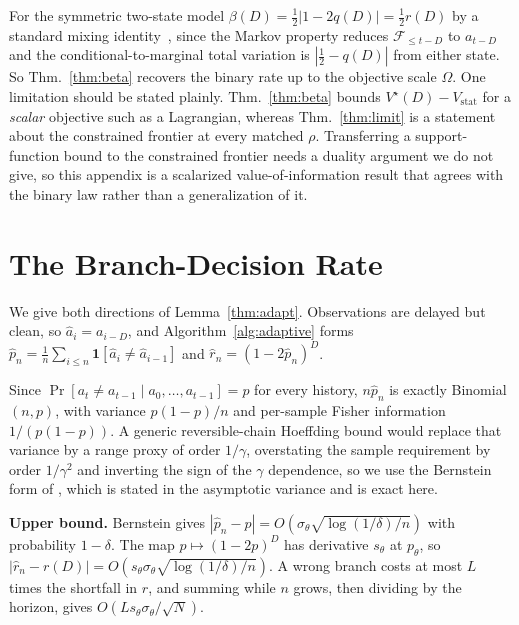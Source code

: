 For the symmetric two-state model $\beta(D)=\tfrac12|1-2q(D)|=\tfrac12 r(D)$ by a
standard mixing identity~\cite{bradley2005,lpw}, since the Markov property reduces
$\mathcal F_{\le t-D}$ to $a_{t-D}$ and the conditional-to-marginal total variation
is $|\tfrac12-q(D)|$ from either state. So Thm.~\ref{thm:beta} recovers the binary rate up to the objective scale
$\Omega$. One limitation should be stated plainly. Thm.~\ref{thm:beta} bounds
$V^\star(D)-V_{\mathrm{stat}}$ for a \emph{scalar} objective such as a Lagrangian,
whereas Thm.~\ref{thm:limit} is a statement about the constrained frontier at every
matched $\rho$. Transferring a support-function bound to the constrained frontier
needs a duality argument we do not give, so this appendix is a scalarized
value-of-information result that agrees with the binary law rather than a
generalization of it.

\section{The Branch-Decision Rate}
\label{app:regret}
We give both directions of Lemma~\ref{thm:adapt}. Observations are delayed but
clean, so $\hat a_i=a_{i-D}$, and Algorithm~\ref{alg:adaptive} forms
$\hat p_n=\tfrac1n\sum_{i\le n}\mathbf 1[\hat a_i\neq\hat a_{i-1}]$ and
$\hat r_n=(1-2\hat p_n)^{D}$.

Since $\Pr[a_t\neq a_{t-1}\mid a_0,\dots,a_{t-1}]=p$ for every history, $n\hat p_n$
is exactly Binomial$(n,p)$, with variance $p(1-p)/n$ and per-sample Fisher
information $1/(p(1-p))$. A generic reversible-chain Hoeffding bound would replace
that variance by a range proxy of order $1/\gamma$, overstating the sample
requirement by order $1/\gamma^{2}$ and inverting the sign of the $\gamma$
dependence, so we use the Bernstein form of \cite{paulin2015}, which is stated in
the asymptotic variance and is exact here.

\noindent\textbf{Upper bound.}
Bernstein gives $|\hat p_n-p|=O(\sigma_\theta\sqrt{\log(1/\delta)/n})$ with
probability $1-\delta$. The map $p\mapsto(1-2p)^{D}$ has derivative $s_\theta$ at
$p_\theta$, so $|\hat r_n-r(D)|=O(s_\theta\sigma_\theta\sqrt{\log(1/\delta)/n})$.
A wrong branch costs at most $L$ times the shortfall in $r$, and summing while $n$
grows, then dividing by the horizon, gives $O(L s_\theta\sigma_\theta/\sqrt N)$.

